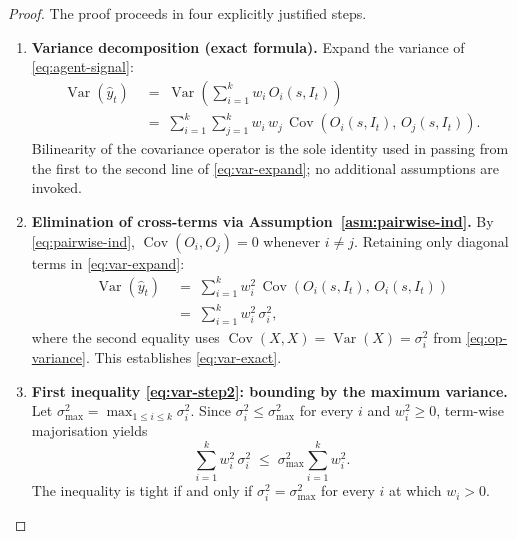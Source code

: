 \documentclass[12pt,openany]{book}
\newcommand{\calI}{\mathcal{I}}
\numberwithin{equation}{chapter}
\theoremstyle{plain}
\theoremstyle{definition}
\theoremstyle{remark}
\numberwithin{equation}{chapter}
\theoremstyle{plain}
\DeclareMathOperator{\Var}{Var}
\DeclareMathOperator{\Cov}{Cov}
\def\calI{I}%
\begin{document}
\begin{proof}
The proof proceeds in four explicitly justified steps.

\begin{enumerate}
  \item \textbf{Variance decomposition (exact formula).}
        Expand the variance of \eqref{eq:agent-signal}:
        \begin{align}
          \Var(\hat{y}_t)
            &\;=\; \Var\!\left(\sum_{i=1}^{k} w_i\,O_i(s,\calI_t)\right)
            \nonumber\\
            &\;=\; \sum_{i=1}^{k}\sum_{j=1}^{k}
                   w_i\,w_j\,
                   \Cov\!\left(O_i(s,\calI_t),\,O_j(s,\calI_t)\right).
          \label{eq:var-expand}
        \end{align}
        Bilinearity of the covariance operator is the sole identity used
        in passing from the first to the second line of
        \eqref{eq:var-expand}; no additional assumptions are invoked.

  \item \textbf{Elimination of cross-terms via
        Assumption~\ref{asm:pairwise-ind}.}
        By \eqref{eq:pairwise-ind}, $\Cov(O_i,O_j) = 0$ whenever
        $i \neq j$.  Retaining only diagonal terms in
        \eqref{eq:var-expand}:
        \begin{align}
          \Var(\hat{y}_t)
            &\;=\; \sum_{i=1}^{k} w_i^2\,
                   \Cov\!\left(O_i(s,\calI_t),\,O_i(s,\calI_t)\right)
            \nonumber\\
            &\;=\; \sum_{i=1}^{k} w_i^2\,\sigma_i^2,
          \label{eq:var-diag}
        \end{align}
        where the second equality uses $\Cov(X,X) = \Var(X) = \sigma_i^2$
        from \eqref{eq:op-variance}.  This establishes \eqref{eq:var-exact}.

  \item \textbf{First inequality \eqref{eq:var-step2}: bounding by the
        maximum variance.}
        Let $\sigma_{\max}^2 = \max_{1 \leq i \leq k}\sigma_i^2$.
        Since $\sigma_i^2 \leq \sigma_{\max}^2$ for every $i$ and
        $w_i^2 \geq 0$, term-wise majorisation yields
        \begin{equation}
          \sum_{i=1}^{k} w_i^2\,\sigma_i^2
            \;\leq\;
            \sigma_{\max}^2 \sum_{i=1}^{k} w_i^2.
          \label{eq:var-maj}
        \end{equation}
        The inequality is tight if and only if $\sigma_i^2 = \sigma_{\max}^2$
        for every $i$ at which $w_i > 0$.


\end{enumerate}
\end{proof}
\end{document}
